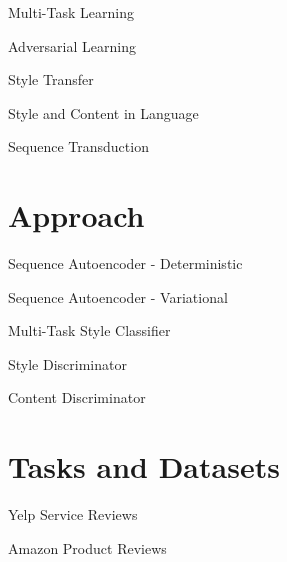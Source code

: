 \documentclass[aspectratio=169]{beamer}
\begin{document}
\begin{frame}{Multi-Task Learning}
\end{frame}

\begin{frame}{Adversarial Learning}
\end{frame}

\begin{frame}{Style Transfer}
\end{frame}

\begin{frame}{Style and Content in Language}
\end{frame}

\begin{frame}{Sequence Transduction}
\end{frame}

% 

\section{Approach}

\begin{frame}{Sequence Autoencoder - Deterministic}
\end{frame}

\begin{frame}{Sequence Autoencoder - Variational}
	\citet{kingma2013auto}
\end{frame}

\begin{frame}{Multi-Task Style Classifier}
\end{frame}

\begin{frame}{Style Discriminator}
\end{frame}

\begin{frame}{Content Discriminator}
\end{frame}

% 

\section{Tasks and Datasets}

\begin{frame}{Yelp Service Reviews}
\end{frame}

\begin{frame}{Amazon Product Reviews}
\end{frame}
\end{document}

